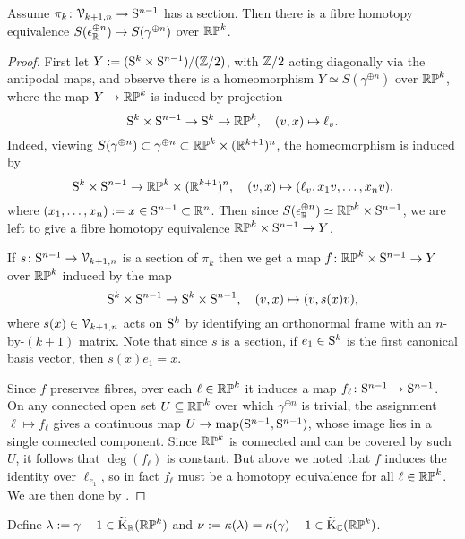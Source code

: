 \begin{lemma}
  \label{RP-reduction}
  Assume $\pi_k \c \V_{k+1,n} \to \S^{n-1}$ has a section. Then there
  is a fibre homotopy equivalence $S(\epsilon_\R^{\oplus n}) \to
  S(\gamma^{\oplus n})$ over $\RP^k$.
\end{lemma}

\begin{proof}
  First let $Y \ce (\S^k \times \S^{n-1})/(\Z/2)$, with $\Z/2$ acting
  diagonally via the antipodal maps, and observe there is a
  homeomorphism $Y \simeq S(\gamma^{\oplus n})$ over $\RP^k$, where the
  map $Y \to \RP^k$ is induced by projection
  \[
  \S^k \times \S^{n-1} \to \S^k \to \RP^k, \quad (v,x) \mapsto \ell_v.
  \]
  Indeed, viewing $S(\gamma^{\oplus n}) \subset \gamma^{\oplus n}
  \subset \RP^k \times (\R^{k+1})^n$, the homeomorphism is induced by
  \[
  \S^k \times \S^{n-1} \to \RP^k \times (\R^{k+1})^n, \quad (v,x)
  \mapsto (\ell_v, x_1v, \ldots, x_nv),
  \]
  where $(x_1,\ldots,x_n) \ce x \in \S^{n-1} \subset \R^n$. Then since
  $S(\epsilon_\R^{\oplus n}) \simeq \RP^k \times \S^{n-1}$, we are
  left to give a fibre homotopy equivalence $\RP^k \times \S^{n-1} \to
  Y$.

  If $s \c \S^{n-1} \to \V_{k+1,n}$ is a section of $\pi_k$ then we
  get a map $f \c \RP^k \times \S^{n-1} \to Y$ over $\RP^k$ induced by
  the map
  \[
  \S^k \times \S^{n-1} \to \S^k \times \S^{n-1}, \quad (v,x) \mapsto
  (v, s(x)v),
  \]
  where $s(x) \in \V_{k+1,n}$ acts on $\S^k$ by identifying an
  orthonormal frame with an $n$-by-$(k+1)$ matrix. Note that since $s$
  is a section, if $e_1 \in \S^k$ is the first canonical basis vector,
  then $s(x)e_1 = x$.

  Since $f$ preserves fibres, over each $\ell \in \RP^k$ it induces a
  map $f_\ell \c \S^{n-1} \to \S^{n-1}$. On any connected open set $U
  \subseteq \RP^k$ over which $\gamma^{\oplus n}$ is trivial, the
  assignment $\ell \mapsto f_\ell$ gives a continuous map $U \to
  \map(\S^{n-1},\S^{n-1})$, whose image lies in a single connected
  component. Since $\RP^k$ is connected and can be covered by such
  $U$, it follows that $\deg(f_\ell)$ is constant. But above we noted
  that $f$ induces the identity over $\ell_{e_1}$, so in fact $f_\ell$
  must be a homotopy equivalence for all $\ell \in \RP^k$. We are then
  done by .
\end{proof}

\begin{notation}
  \label{RP-notation}
  Define $\lambda \ce \gamma - 1 \in \wt\K_\R(\RP^k)$ and $\nu \ce
  \kappa(\lambda) = \kappa(\gamma) - 1 \in \wt\K_\C(\RP^k)$.
\end{notation}

